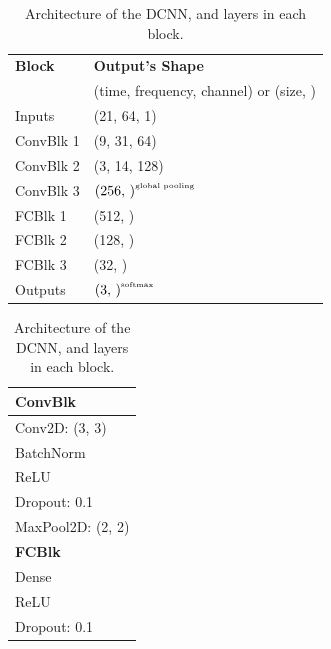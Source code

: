 \documentclass[a4paper]{article}
\begin{document}
\begin{table}[t] \label{tbl:dcnn-arch}
  \caption{Architecture of the DCNN, and layers in each block.}
  \centering
  \begin{tabular}{ll}
    \toprule
    \textbf{Block}    & \textbf{Output's Shape}                         \\
                      & \tiny{(time, frequency, channel) or (size, )}   \\ \midrule
    Inputs            & (21, 64, 1)                                     \\ \midrule
    ConvBlk 1         & (9, 31, 64)                                     \\
    ConvBlk 2         & (3, 14, 128)                                    \\
    ConvBlk 3         & $\text{(256, )}^{\text{\tiny{global pooling}}}$ \\ \midrule
    FCBlk 1           & (512, )                                         \\
    FCBlk 2           & (128, )                                         \\
    FCBlk 3           & (32, )                                          \\ \midrule
    Outputs           & $\text{(3, )}^{\text{\tiny{softmax}}}$          \\
    \bottomrule
  \end{tabular}
  \begin{footnotesize}
    \begin{tabular}{l}
      \toprule
      \textbf{ConvBlk}   \\ \midrule
      Conv2D: (3, 3)     \\
      BatchNorm          \\
      ReLU               \\
      Dropout:  0.1      \\
      MaxPool2D: (2, 2)  \\
      \bottomrule
      \toprule
      \textbf{FCBlk}     \\ \midrule
      Dense              \\
      ReLU               \\
      Dropout:  0.1      \\
      \bottomrule
    \end{tabular}
  \end{footnotesize}
  \vspace*{-\baselineskip}
\end{table}
\end{document}
